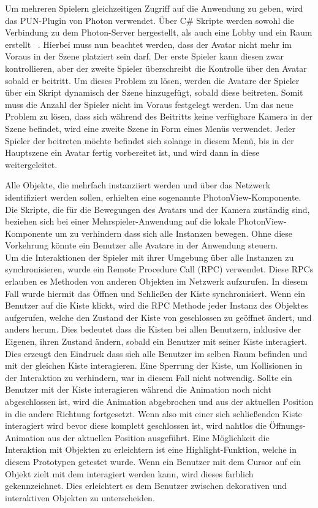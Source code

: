 Um mehreren Spielern gleichzeitigen Zugriff auf die Anwendung zu geben, wird das PUN-Plugin von Photon verwendet. Über C\# Skripte werden sowohl die Verbindung zu dem Photon-Server hergestellt, als auch eine Lobby und ein Raum erstellt ~\parencite{InfoGamer2018}.
Hierbei muss nun beachtet werden, dass der Avatar nicht mehr im Voraus in der Szene platziert sein darf. Der erste Spieler kann diesen zwar kontrollieren, aber der zweite Spieler überschreibt die Kontrolle über den Avatar sobald er beitritt. Um dieses Problem zu lösen, werden die Avatare der Spieler über ein Skript dynamisch der Szene hinzugefügt, sobald diese beitreten. Somit muss die Anzahl der Spieler nicht im Voraus festgelegt werden. Um das neue Problem zu lösen, dass sich während des Beitritts keine verfügbare Kamera in der Szene befindet, wird eine zweite Szene in Form eines Menüs verwendet. Jeder Spieler der beitreten möchte befindet sich solange in diesem Menü, bis in der Hauptszene ein Avatar fertig vorbereitet ist, und wird dann in diese weitergeleitet. \newline

Alle Objekte, die mehrfach instanziiert werden und über das Netzwerk identifiziert werden sollen, erhielten eine sogenannte PhotonView-Komponente. Die Skripte, die für die Bewegungen des Avatars und der Kamera zuständig sind, beziehen sich bei einer Mehrspieler-Anwendung auf die lokale PhotonView-Komponente um zu verhindern dass sich alle Instanzen bewegen. Ohne diese Vorkehrung könnte ein Benutzer alle Avatare in der Anwendung steuern. \\

Um die Interaktionen der Spieler mit ihrer Umgebung über alle Instanzen zu synchronisieren, wurde ein Remote Procedure Call (RPC) verwendet. Diese RPCs erlauben es Methoden von anderen Objekten im Netzwerk aufzurufen. In diesem Fall wurde hiermit das Öffnen und Schließen der Kiste synchronisiert. Wenn ein Benutzer auf die Kiste klickt, wird die RPC Methode jeder Instanz des Objektes aufgerufen, welche den Zustand der Kiste von geschlossen zu geöffnet ändert, und anders herum. Dies bedeutet dass die Kisten bei allen Benutzern, inklusive der Eigenen, ihren Zustand ändern, sobald ein Benutzer mit seiner Kiste interagiert. Dies erzeugt den Eindruck dass sich alle Benutzer im selben Raum befinden und mit der gleichen Kiste interagieren. Eine Sperrung der Kiste, um Kollisionen in der Interaktion zu verhindern, war in diesem Fall nicht notwendig. Sollte ein Benutzer mit der Kiste interagieren während die Animation noch nicht abgeschlossen ist, wird die Animation abgebrochen und aus der aktuellen Position in die andere Richtung fortgesetzt. Wenn also mit einer sich schließenden Kiste interagiert wird bevor diese komplett geschlossen ist, wird nahtlos die Öffnungs-Animation aus der aktuellen Position ausgeführt. \newline 
Eine Möglichkeit die Interaktion mit Objekten zu erleichtern ist eine Highlight-Funktion, welche in diesem Prototypen getestet wurde. Wenn ein Benutzer mit dem Cursor auf ein Objekt zielt mit dem interagiert werden kann, wird dieses farblich gekennzeichnet. Dies erleichtert es dem Benutzer zwischen dekorativen und interaktiven Objekten zu unterscheiden.


